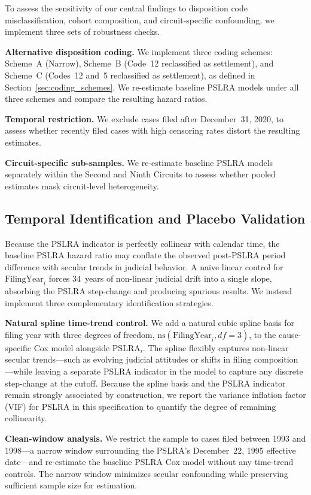 To assess the sensitivity of our central findings to
disposition code misclassification, cohort composition, and
circuit-specific confounding, we implement three sets of
robustness checks.

\textbf{Alternative disposition coding.} We implement three
coding schemes: Scheme~A (Narrow), Scheme~B (Code~12
reclassified as settlement), and Scheme~C (Codes~12 and~5
reclassified as settlement), as defined in Section~\ref{sec:coding_schemes}.
We re-estimate baseline PSLRA models under all three schemes
and compare the resulting hazard ratios.

\textbf{Temporal restriction.} We exclude cases filed after
December~31, 2020, to assess whether recently filed cases with
high censoring rates distort the resulting estimates.

\textbf{Circuit-specific sub-samples.} We re-estimate baseline
PSLRA models separately within the Second and Ninth Circuits
to assess whether pooled estimates mask circuit-level
heterogeneity.

\subsection{Temporal Identification and Placebo Validation}
\label{sec:temporal_id}

Because the PSLRA indicator is perfectly collinear with
calendar time, the baseline PSLRA hazard ratio may conflate
the observed post-PSLRA period difference with secular trends in
judicial behavior. A na\"ive linear control for
$\text{FilingYear}_i$ forces 34~years of non-linear judicial
drift into a single slope, absorbing the PSLRA step-change
and producing spurious results. We instead implement three
complementary identification strategies.

\textbf{Natural spline time-trend control.} We add a natural
cubic spline basis for filing year with three degrees of
freedom, $\text{ns}(\text{FilingYear}_i, df{=}3)$, to the
cause-specific Cox model alongside $\text{PSLRA}_i$. The
spline flexibly captures non-linear secular trends---such as
evolving judicial attitudes or shifts in filing
composition---while leaving a separate PSLRA indicator in the
model to capture any discrete step-change at the cutoff.
Because the spline basis and the PSLRA indicator remain
strongly associated by construction, we report the variance
inflation factor (VIF) for PSLRA in this specification to
quantify the degree of remaining collinearity.

\textbf{Clean-window analysis.} We restrict the sample to
cases filed between 1993 and 1998---a narrow window
surrounding the PSLRA's December~22, 1995 effective
date---and re-estimate the baseline PSLRA Cox model without
any time-trend controls. The narrow window minimizes secular
confounding while preserving sufficient sample size for
estimation.

